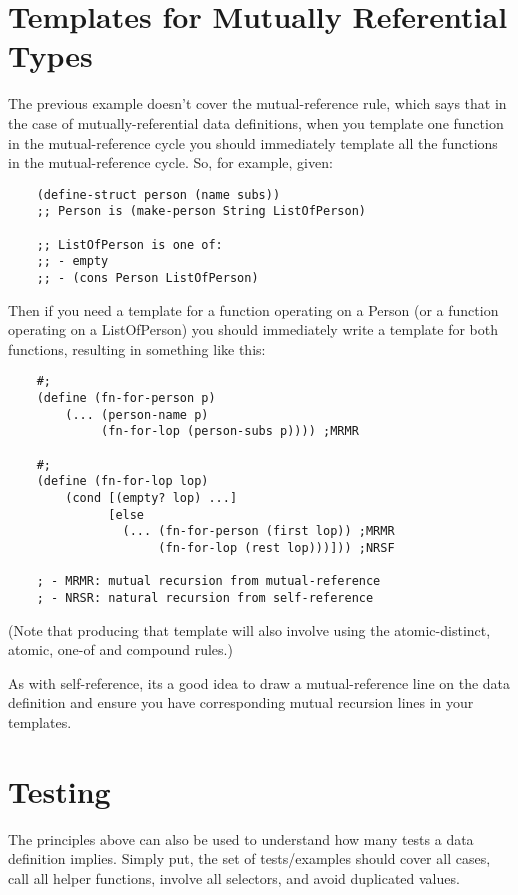 \documentclass[11pt,a4paper]{report}
\begin{document}
	\section{Templates for Mutually Referential Types}
	The previous example doesn't cover the mutual-reference rule, which says that in the case of
	mutually-referential data definitions, when you template one function in the mutual-reference
	cycle you should immediately template all the functions in the mutual-reference cycle. So, for
	example, given:
	\begin{verbatim}
	(define-struct person (name subs))
	;; Person is (make-person String ListOfPerson)
	
	;; ListOfPerson is one of:
	;; - empty
	;; - (cons Person ListOfPerson)
	\end{verbatim}
	Then if you need a template for a function operating on a Person (or a function operating on a
	ListOfPerson) you should immediately write a template for both functions, resulting in
	something like this:
	\begin{verbatim}
	#;
	(define (fn-for-person p)
		(... (person-name p)
		     (fn-for-lop (person-subs p)))) ;MRMR
	
	#;
	(define (fn-for-lop lop)
		(cond [(empty? lop) ...]
		      [else
		        (... (fn-for-person (first lop)) ;MRMR
	        	     (fn-for-lop (rest lop)))])) ;NRSF
	        	     
	; - MRMR: mutual recursion from mutual-reference
	; - NRSR: natural recursion from self-reference
	\end{verbatim}
	
	(Note that producing that template will also involve using the atomic-distinct, atomic, one-of and
	compound rules.)
	
	As with self-reference, its a good idea to draw a mutual-reference line on the data definition and
	ensure you have corresponding mutual recursion lines in your templates.
	
	\section{Testing}
	The principles above can also be used to understand how many tests a data definition implies.
	Simply put, the set of tests/examples should cover all cases, call all helper functions, involve all
	selectors, and avoid duplicated values.
	
\end{document}
